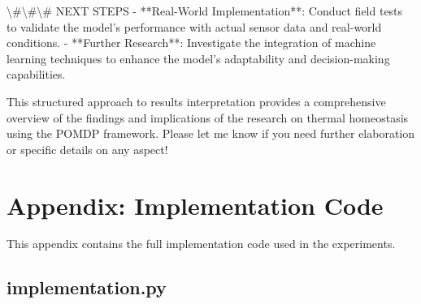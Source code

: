 \documentclass[11pt,a4paper]{article}
\begin{document}
\textbackslash{}#\textbackslash{}#\textbackslash{}# NEXT STEPS
- **Real-World Implementation**: Conduct field tests to validate the model's performance with actual sensor data and real-world conditions.
- **Further Research**: Investigate the integration of machine learning techniques to enhance the model's adaptability and decision-making capabilities.

This structured approach to results interpretation provides a comprehensive overview of the findings and implications of the research on thermal homeostasis using the POMDP framework. Please let me know if you need further elaboration or specific details on any aspect!
\section{Appendix: Implementation Code}

This appendix contains the full implementation code used in the experiments.


\subsection{implementation.py}
\end{document}
